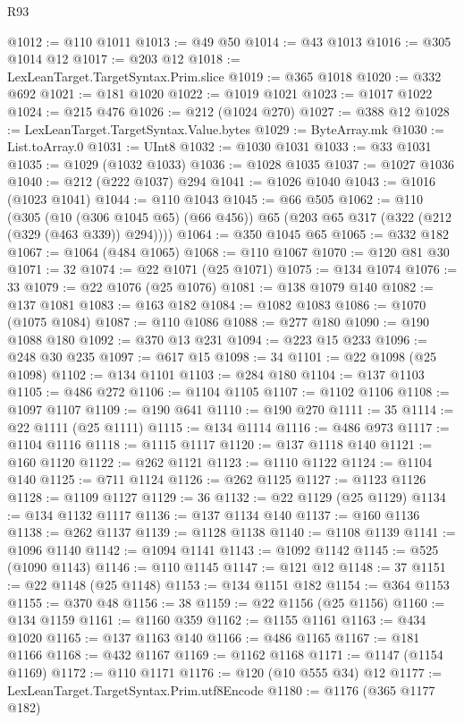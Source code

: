 \begin{lexlean}{R93}
\begin{coremodule}
@1012 := @110 @1011
@1013 := @49 @50
@1014 := @43 @1013
@1016 := @305 @1014 @12
@1017 := @203 @12
@1018 := LexLeanTarget.TargetSyntax.Prim.slice
@1019 := @365 @1018
@1020 := @332 @692
@1021 := @181 @1020
@1022 := @1019 @1021
@1023 := @1017 @1022
@1024 := @215 @476
@1026 := @212 (@1024 @270)
@1027 := @388 @12
@1028 := LexLeanTarget.TargetSyntax.Value.bytes
@1029 := ByteArray.mk
@1030 := List.toArray.{0}
@1031 := UInt8
@1032 := @1030 @1031
@1033 := @33 @1031
@1035 := @1029 (@1032 @1033)
@1036 := @1028 @1035
@1037 := @1027 @1036
@1040 := @212 (@222 @1037) @294
@1041 := @1026 @1040
@1043 := @1016 (@1023 @1041)
@1044 := @110 @1043
@1045 := @66 @505
@1062 := @110
    (@305
      (@10 (@306 @1045 @65) (@66 @456))
      @65
      (@203 @65 @317 (@322 (@212 (@329 (@463 @339)) @294))))
@1064 := @350 @1045 @65
@1065 := @332 @182
@1067 := @1064 (@484 @1065)
@1068 := @110 @1067
@1070 := @120 @81 @30
@1071 := 32
@1074 := @22 @1071 (@25 @1071)
@1075 := @134 @1074
@1076 := 33
@1079 := @22 @1076 (@25 @1076)
@1081 := @138 @1079 @140
@1082 := @137 @1081
@1083 := @163 @182
@1084 := @1082 @1083
@1086 := @1070 (@1075 @1084)
@1087 := @110 @1086
@1088 := @277 @180
@1090 := @190 @1088 @180
@1092 := @370 @13 @231
@1094 := @223 @15 @233
@1096 := @248 @30 @235
@1097 := @617 @15
@1098 := 34
@1101 := @22 @1098 (@25 @1098)
@1102 := @134 @1101
@1103 := @284 @180
@1104 := @137 @1103
@1105 := @486 @272
@1106 := @1104 @1105
@1107 := @1102 @1106
@1108 := @1097 @1107
@1109 := @190 @641
@1110 := @190 @270
@1111 := 35
@1114 := @22 @1111 (@25 @1111)
@1115 := @134 @1114
@1116 := @486 @973
@1117 := @1104 @1116
@1118 := @1115 @1117
@1120 := @137 @1118 @140
@1121 := @160 @1120
@1122 := @262 @1121
@1123 := @1110 @1122
@1124 := @1104 @140
@1125 := @711 @1124
@1126 := @262 @1125
@1127 := @1123 @1126
@1128 := @1109 @1127
@1129 := 36
@1132 := @22 @1129 (@25 @1129)
@1134 := @134 @1132 @1117
@1136 := @137 @1134 @140
@1137 := @160 @1136
@1138 := @262 @1137
@1139 := @1128 @1138
@1140 := @1108 @1139
@1141 := @1096 @1140
@1142 := @1094 @1141
@1143 := @1092 @1142
@1145 := @525 (@1090 @1143)
@1146 := @110 @1145
@1147 := @121 @12
@1148 := 37
@1151 := @22 @1148 (@25 @1148)
@1153 := @134 @1151 @182
@1154 := @364 @1153
@1155 := @370 @48
@1156 := 38
@1159 := @22 @1156 (@25 @1156)
@1160 := @134 @1159
@1161 := @1160 @359
@1162 := @1155 @1161
@1163 := @434 @1020
@1165 := @137 @1163 @140
@1166 := @486 @1165
@1167 := @181 @1166
@1168 := @432 @1167
@1169 := @1162 @1168
@1171 := @1147 (@1154 @1169)
@1172 := @110 @1171
@1176 := @120 (@10 @555 @34) @12
@1177 := LexLeanTarget.TargetSyntax.Prim.utf8Encode
@1180 := @1176 (@365 @1177 @182)

\end{coremodule}
\end{lexlean}
